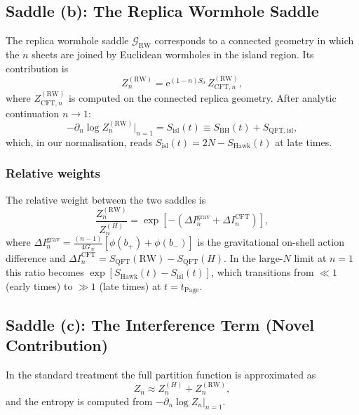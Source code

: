 \documentclass[12pt,a4paper]{article}
\newcommand{\SBH}{S_{\mathrm{BH}}}
\newcommand{\SHawk}{S_{\mathrm{Hawk}}}
\newcommand{\Sisl}{S_{\mathrm{isl}}}
\newcommand{\tPage}{t_{\mathrm{Page}}}
\newcommand{\e}{\mathrm{e}}
\newcommand{\Phi}{\phi}  %
\begin{document}
\subsection{Saddle (b): The Replica Wormhole Saddle}
\label{subsec:rw_saddle}

The replica wormhole saddle $\mathcal{G}_{\mathrm{RW}}$ corresponds to a
connected geometry in which the $n$ sheets are joined by Euclidean wormholes
in the island region.  Its contribution is~\citep{Almheiri2019b}
\begin{equation}
  Z_n^{(\mathrm{RW})} = \e^{(1-n)S_0}\,Z_{\mathrm{CFT},n}^{(\mathrm{RW})},
\label{eq:Z_rw}
\end{equation}
where $Z_{\mathrm{CFT},n}^{(\mathrm{RW})}$ is computed on the connected
replica geometry.  After analytic continuation $n\to 1$:
\begin{equation}
  -\partial_n \log Z_n^{(\mathrm{RW})}\Big|_{n=1}
    = \Sisl(t) \equiv \SBH(t) + S_{\mathrm{QFT,isl}},
\label{eq:S_island_formula}
\end{equation}
which, in our normalisation, reads $\Sisl(t) = 2N - \SHawk(t)$ at late times.

\subsubsection*{Relative weights}

The relative weight between the two saddles is
\begin{equation}
  \frac{Z_n^{(\mathrm{RW})}}{Z_n^{(H)}}
    = \exp\!\left[-\left(\Delta I_n^{\mathrm{grav}} + \Delta I_n^{\mathrm{CFT}}\right)\right],
\label{eq:relative_weight}
\end{equation}
where $\Delta I_n^{\mathrm{grav}} = \frac{(n-1)}{4G_N}\left[\Phi(b_+)+\Phi(b_-)\right]$
is the gravitational on-shell action difference and
$\Delta I_n^{\mathrm{CFT}} = S_{\mathrm{QFT}}(\mathrm{RW}) - S_{\mathrm{QFT}}(H)$.
In the large-$N$ limit at $n=1$ this ratio becomes
$\exp\!\left[\SHawk(t) - \Sisl(t)\right]$,
which transitions from $\ll 1$ (early times) to $\gg 1$ (late times) at
$t = \tPage$.

\subsection{Saddle (c): The Interference Term (Novel Contribution)}
\label{subsec:interference}

In the standard treatment the full partition function is approximated as
\begin{equation}
  Z_n \approx Z_n^{(H)} + Z_n^{(\mathrm{RW})},
\label{eq:Z_sum_saddles}
\end{equation}
and the entropy is computed from $-\partial_n\log Z_n|_{n=1}$.
\end{document}
